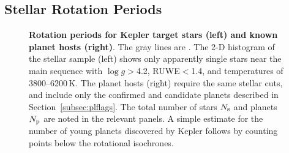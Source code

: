 \documentclass[11pt,twocolumn,tighten]{aastex63}
\begin{document}
\subsection{Stellar Rotation Periods}
\label{subsec:rotsel}


\begin{figure}[!t]
	\begin{center}
	\end{center}
	\vspace{-0.5cm}
	\caption{
    {\bf Rotation periods for Kepler target stars (left) and known
    planet hosts (right)}.  The gray lines are .  The 2-D histogram of the
    stellar sample (left) shows only apparently single stars near
    the main sequence with $\log g$$>$4.2, RUWE$<$1.4, and
    temperatures of 3800--6200\,K.  The planet hosts (right) require
    the same stellar cuts, and include only the confirmed and
    candidate planets described in Section~\ref{subsec:plflags}.  The
    total number of stars $N_{\rm s}$ and planets $N_{\rm p}$ are noted in
    the relevant panels.  A simple estimate for the number of young
    planets discovered by Kepler follows by counting points below the
    rotational isochrones.
	}
	\label{fig:prot_vs_teff}
\end{figure}
\end{document}
